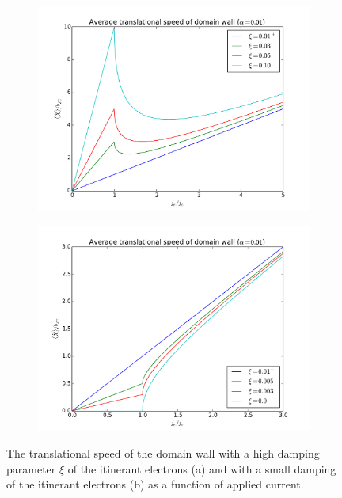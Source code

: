\documentclass[12pt, a4paper]{article}		%
\numberwithin{equation}{section}
\begin{document}
\begin{figure}[h!]
\centering
\begin{subfigure}{.5\textwidth}
  \centering
  \includegraphics[width=1.0\linewidth]{Figures/walkerBreakdown}
  \caption{}
  \label{fig:walkerBreakdown}
\end{subfigure}%
\begin{subfigure}{.5\textwidth}
  \centering
  \includegraphics[width=1.0\linewidth]{Figures/criticalCurrentXdot}
  \caption{}
  \label{fig:criticalCurrent}
\end{subfigure}
\caption{The translational speed of the domain wall with a high damping parameter $\xi$ of the itinerant electrons (a) and with a small damping of the itinerant electrons (b) as a function of applied current.}
\label{fig:Xdot_afo_current}
\end{figure}
\end{document}
